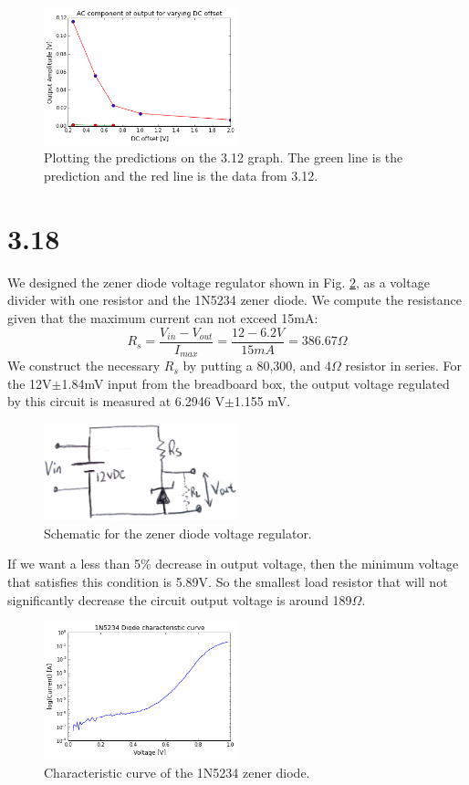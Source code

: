 \documentclass[authoryear, 12pt,5p, times]{elsarticle}
\begin{document}
\begin{figure}[h!]
\center
\includegraphics[width=0.5\textwidth]{figure/bad}
\caption{Plotting the predictions on the 3.12 graph. The green line is the prediction and the red line is the data from 3.12.}
\label{bad}
\end{figure}
\section*{3.18}
We designed the zener diode voltage regulator shown in Fig. \ref{3_18_schematic}, as a voltage divider with one resistor and the 1N5234 zener diode. We compute the resistance given that the maximum current can not exceed 15mA:
\begin{equation}
R_s = \frac{V_{in}-V_{out}}{I_{max}}=\frac{12-6.2 V}{15mA} =386.67\Omega
\end{equation}
We construct the necessary $R_s$ by putting a 80,300, and 4$\Omega$ resistor in series. For the 12V$\pm$1.84mV input from the breadboard box, the output voltage regulated by this circuit is measured at 6.2946 V$\pm$1.155 mV.
\begin{figure}[h!]
\center
\includegraphics[width=0.5\textwidth]{figure/3_18_schematic}
\caption{Schematic for the zener diode voltage regulator.}
\label{3_18_schematic}
\end{figure}
If we want a less than 5\% decrease in output voltage, then the minimum voltage that satisfies this condition is 5.89V. So the smallest load resistor that will not significantly decrease the circuit output voltage is around 189$\Omega$. 
\begin{figure}[h!]
\center
\includegraphics[width=0.5\textwidth]{figure/3_18_curve}
\caption{Characteristic curve of the 1N5234 zener diode. }
\label{3_18_curve}
\end{figure}
\end{document}
